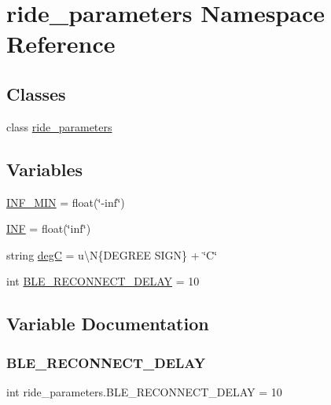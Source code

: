 \hypertarget{namespaceride__parameters}{}\section{ride\+\_\+parameters Namespace Reference}
\label{namespaceride__parameters}
\subsection*{Classes}
\begin{DoxyCompactItemize}
\item 
class \hyperlink{classride__parameters_1_1ride__parameters}{ride\+\_\+parameters}
\end{DoxyCompactItemize}
\subsection*{Variables}
\begin{DoxyCompactItemize}
\item 
\hyperlink{namespaceride__parameters_a6605e02cf88ea9141ef221e189880b44}{I\+N\+F\+\_\+\+M\+IN} = float(\char`\"{}-\/inf\char`\"{})
\item 
\hyperlink{namespaceride__parameters_aed07fece4b73a71db05eca975feb7f8e}{I\+NF} = float(\char`\"{}inf\char`\"{})
\item 
string \hyperlink{namespaceride__parameters_aa8a786582b146deb4586ee5beb2b191f}{degC} = u\textquotesingle{}\textbackslash{}N\{D\+E\+G\+R\+EE S\+I\+GN\}\textquotesingle{} + \char`\"{}C\char`\"{}
\item 
int \hyperlink{namespaceride__parameters_a70071ccacf7f6103341995b2966d7009}{B\+L\+E\+\_\+\+R\+E\+C\+O\+N\+N\+E\+C\+T\+\_\+\+D\+E\+L\+AY} = 10
\end{DoxyCompactItemize}


\subsection{Variable Documentation}
\mbox{\label{namespaceride__parameters_a70071ccacf7f6103341995b2966d7009}} 
\subsubsection{\texorpdfstring{B\+L\+E\+\_\+\+R\+E\+C\+O\+N\+N\+E\+C\+T\+\_\+\+D\+E\+L\+AY}{BLE\_RECONNECT\_DELAY}}
{\footnotesize\ttfamily int ride\+\_\+parameters.\+B\+L\+E\+\_\+\+R\+E\+C\+O\+N\+N\+E\+C\+T\+\_\+\+D\+E\+L\+AY = 10}

